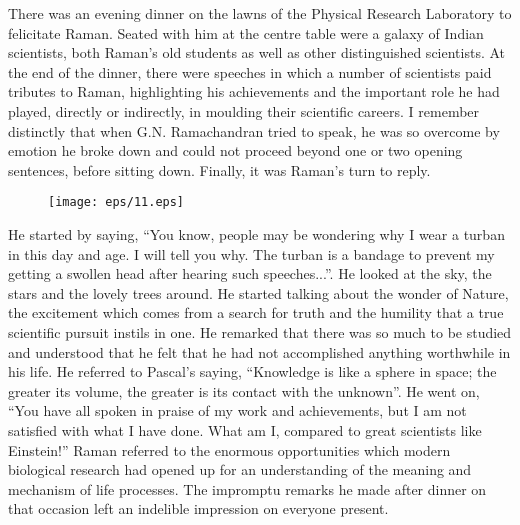 There was an evening dinner on the lawns of the Physical
Research Laboratory to felicitate Raman. Seated with him at the
centre table were a galaxy of Indian scientists, both Raman's old
students as well as other distinguished scientists. At the end of
the dinner, there were speeches in which a number of scientists
paid tributes to Raman, highlighting his achievements and
the important role he had played, directly or indirectly, in moulding their
 scientific careers. I remember distinctly that when
G.N. Ramachandran tried to speak, he was so overcome by
emotion he broke down and could not proceed beyond one or
two opening sentences, before sitting down. Finally, it was
Raman's turn to reply. 
\begin{figure}[H]
\begin{center}
\texttt{[image: eps/11.eps]}
\end{center}
{\fontsize{10pt}{11pt}\selectfont{\em C.V. Raman and Vikram Sarabhai during the Indian Academy of Sciences annual meeting held in Ahmedabad in December 1968. The Academy honoured Raman on his 80th birthday at this meeting.}}\relax
\end{figure}

\newpage

\begin{figure}[H]
\relax
\end{figure}

He started by saying, ``You know, people may be wondering
why I wear a turban in this day and age. I will tell you why. The
turban is a bandage to prevent my getting a swollen head after
hearing such speeches...''. He looked at the sky, the stars and
the lovely trees around. He started talking about the wonder of
Nature, the excitement which comes from a search for truth and
the humility that a true scientific pursuit instils in one. He
remarked that there was so much to be studied and understood
that he felt that he had not accomplished anything worthwhile
in his life. He referred to Pascal's saying, ``Knowledge is
like a sphere in space; the greater its volume, the greater is its
contact with the unknown''. He went on, ``You have all spoken
in praise of my work and achievements, but I am not satisfied
with what I have done. What am I, compared to great scientists
like Einstein!'' Raman referred to the enormous opportunities
which modern biological research had opened up for an
understanding of the meaning and mechanism of life processes.
The impromptu remarks he made after dinner on that occasion
left an indelible impression on everyone present.

